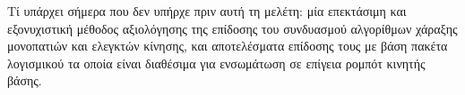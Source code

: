 \documentclass[a4paper,10pt]{article}
\begin{document}
Τί υπάρχει σήμερα που δεν υπήρχε πριν αυτή τη μελέτη: μία επεκτάσιμη και
εξονυχιστική μέθοδος αξιολόγησης της επίδοσης του συνδυασμού αλγορίθμων χάραξης
μονοπατιών και ελεγκτών κίνησης, και αποτελέσματα επίδοσης τους με βάση πακέτα
λογισμικού τα οποία είναι διαθέσιμα για ενσωμάτωση σε επίγεια ρομπότ κινητής
βάσης.
\end{document}
